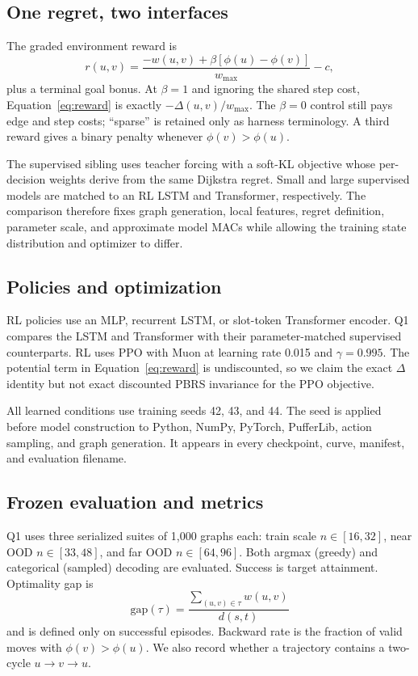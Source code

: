 \documentclass[10pt,twocolumn]{article}
\newcommand{\dlt}{\Delta}
\newcommand{\ph}{\phi}
\newcommand{\wmax}{w_{\max}}
\begin{document}
\subsection{One regret, two interfaces}

The graded environment reward is
\begin{equation}
 r(u,v)=
 \frac{-w(u,v)+\beta\!\left[\ph(u)-\ph(v)\right]}{\wmax}-c,
 \label{eq:reward}
\end{equation}
plus a terminal goal bonus.  At $\beta=1$ and ignoring the shared step cost,
Equation~\eqref{eq:reward} is exactly $-\dlt(u,v)/\wmax$.  The $\beta=0$ control still
pays edge and step costs; ``sparse'' is retained only as harness terminology.
A third reward gives a binary penalty whenever $\ph(v)>\ph(u)$.

The supervised sibling uses teacher forcing with a soft-KL objective whose
per-decision weights derive from the same Dijkstra regret.  Small and large
supervised models are matched to an RL LSTM and Transformer, respectively.
The comparison therefore fixes graph generation, local features, regret
definition, parameter scale, and approximate model MACs while allowing the
training state distribution and optimizer to differ.

\subsection{Policies and optimization}

RL policies use an MLP, recurrent LSTM, or slot-token Transformer encoder.
Q1 compares the LSTM and Transformer with their parameter-matched supervised
counterparts.  RL uses PPO with Muon at learning rate 0.015 and
$\gamma=0.995$.  The potential term in Equation~\eqref{eq:reward} is undiscounted, so we
claim the exact $\dlt$ identity but not exact discounted PBRS invariance for
the PPO objective.

All learned conditions use training seeds 42, 43, and 44.  The seed is applied
before model construction to Python, NumPy, PyTorch, PufferLib, action
sampling, and graph generation.  It appears in every checkpoint, curve,
manifest, and evaluation filename.

\subsection{Frozen evaluation and metrics}

Q1 uses three serialized suites of 1,000 graphs each: train scale
$n\in[16,32]$, near OOD $n\in[33,48]$, and far OOD $n\in[64,96]$.
Both argmax (greedy) and categorical (sampled) decoding are evaluated.
Success is target attainment.  Optimality gap is
\begin{equation}
  \mathrm{gap}(\tau)=
  \frac{\sum_{(u,v)\in\tau} w(u,v)}{d(s,t)}
\end{equation}
and is defined only on successful episodes.  Backward rate is the fraction of
valid moves with $\ph(v)>\ph(u)$.  We also record whether a trajectory
contains a two-cycle $u\!\rightarrow\!v\!\rightarrow\!u$.
\end{document}

